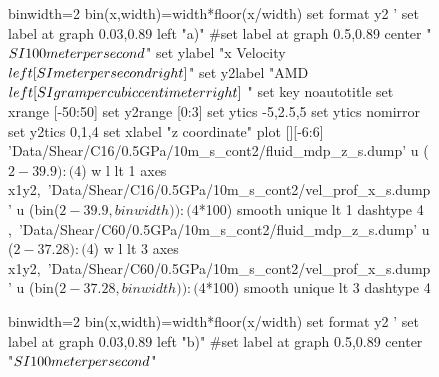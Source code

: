 \documentclass[aps,prb,reprint,superscriptaddress, a4paper]{revtex4-1}
\begin{document}
\begin{figure}[h]
    	\begin{center}
		\begin{gnuplot}[terminal=pdf, terminaloptions={size \SERFigwidth cm, \SERFigheight cm color solid}]
			binwidth=2
			bin(x,width)=width*floor(x/width)
			set format y2 '%
			set label at graph 0.03,0.89 left "a)"
			#set label at graph 0.5,0.89 center "$\\SI{100}{\\meter\\per\\second}$"
			set ylabel "x Velocity $\\left[ \\SI{}{\\meter\\per\\second} \\right]$"
			set y2label "AMD $\\left[ \\SI{}{\\gram\\per\\cubic\\centi\\meter} \\right]$ "
			set key noautotitle
			set xrange [-50:50]
			set y2range [0:3]
			set ytics  -5,2.5,5
			set ytics nomirror
			set y2tics 0,1,4
			set xlabel "z coordinate"  
			plot  	[][-6:6]  'Data/Shear/C16/0.5GPa/10m_s_cont2/fluid_mdp_z_s.dump' u ($2-39.9):($4) w l  lt 1 axes x1y2,\
				              'Data/Shear/C16/0.5GPa/10m_s_cont2/vel_prof_x_s.dump'  u (bin($2-39.9,binwidth)):($4*100) smooth unique lt 1 dashtype 4 ,\	
                              'Data/Shear/C60/0.5GPa/10m_s_cont2/fluid_mdp_z_s.dump' u ($2-37.28):($4) w l  lt 3  axes x1y2,\
				              'Data/Shear/C60/0.5GPa/10m_s_cont2/vel_prof_x_s.dump'  u (bin($2-37.28,binwidth)):($4*100) smooth unique lt 3 dashtype 4 
		\end{gnuplot}
		\begin{gnuplot}[terminal=pdf, terminaloptions={size \SERFigwidth cm, \SERFigheight cm color solid}]
			binwidth=2
			bin(x,width)=width*floor(x/width)
			set format y2 '%
			set label at graph 0.03,0.89 left "b)"
			#set label at graph 0.5,0.89 center "$\\SI{100}{\\meter\\per\\second}$"

\end{gnuplot}
\end{center}
\end{figure}
\end{document}
